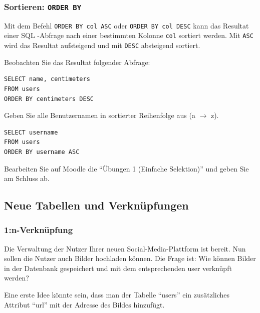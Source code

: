 \subsubsection*{Sortieren: \texorpdfstring{\lstinline|ORDER BY|}{ORDER BY}}

Mit dem Befehl \lstinline|ORDER BY col ASC| oder \lstinline|ORDER BY col DESC| kann das Resultat einer \gls{SQL} -Abfrage nach einer bestimmten Kolonne \lstinline|col| sortiert werden. Mit \lstinline|ASC| wird das Resultat aufsteigend und mit \lstinline|DESC| absteigend sortiert.

\begin{myexample}
Beobachten Sie das Resultat folgender Abfrage:

\begin{lstlisting}
SELECT name, centimeters 
FROM users 
ORDER BY centimeters DESC
\end{lstlisting}
\end{myexample}

\begin{myexercise}
  Geben Sie alle Benutzernamen in sortierter Reihenfolge aus (a $\rightarrow$ z).
  \begin{myanswer}
    \begin{lstlisting}
SELECT username
FROM users
ORDER BY username ASC
\end{lstlisting}
  \end{myanswer}
\end{myexercise}

\begin{mysubmission}
  Bearbeiten Sie auf Moodle die ``Übungen 1 (Einfache Selektion)'' und geben Sie am Schluss ab.
\end{mysubmission}

\subsection{Neue Tabellen und Verknüpfungen}
\subsubsection{1:n-Verknüpfung}
Die Verwaltung der Nutzer Ihrer neuen Social-Media-Plattform ist bereit. Nun sollen die Nutzer auch Bilder hochladen können. Die Frage ist: Wie können Bilder in der Datenbank gespeichert und mit dem entsprechenden user verknüpft werden?

Eine erste Idee könnte sein, dass man der Tabelle \enquote{users} ein zusätzliches Attribut \enquote{url} mit der Adresse des Bildes hinzufügt.

